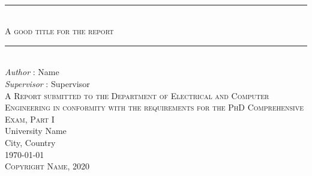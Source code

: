
\newcommand{\HRule}{\rule{\linewidth}{0.5mm}} 
	
\begin{titlepage}
	\center

	\sffamily
	\mbox{} \\[2cm]

	
	\HRule
	\mbox{} \\[0.55cm]
	
	\textsc{\LARGE A good title for the report}\\[0.3cm] 
		
	\HRule
	\mbox{} \\[3cm]



	\emph{Author} : Name\\
	\emph{Supervisor} : Supervisor\\[4cm]

	\textsc{A Report submitted to the Department of Electrical and Computer Engineering in conformity with the requirements for the PhD Comprehensive Exam, Part I}
	\\[4cm] 


	University Name\\
	City, Country\\

	{\today}\\[3cm]
	{\textsc{\tiny Copyright \textsuperscript{\textcopyright} Name, 2020}}
	
\end{titlepage}


\begin{abstract}

	\lipsum[1-2]
	
\end{abstract}
